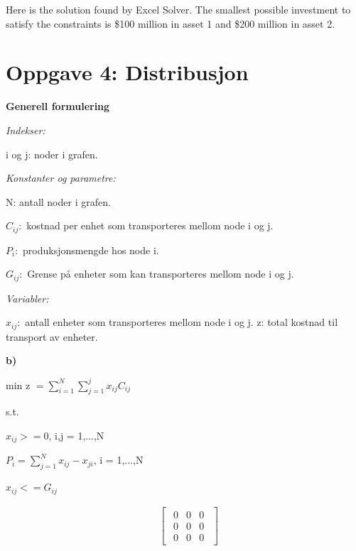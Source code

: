 \documentclass{article}
\begin{document}
    Here is the solution found by Excel Solver. The smallest possible investment to satisfy the constraints is \$100 million in asset 1 and \$200 million in asset 2.
    
    \pagebreak\section*{\textbf{Oppgave 4: Distribusjon}}
    \small\textbf{Generell formulering}

    \vspace*{5mm}
    \textit{Indekser:}
    
    i og j: noder i grafen.
    
    \vspace*{5mm}
    \textit{Konstanter og parametre:}
    
    N: antall noder i grafen.
    
    $C_{ij}:$ kostnad per enhet som transporteres mellom node i og j.
    
    $P_i:$ produksjonsmengde hos node i.
    
    $G_{ij}:$ Grense på enheter som kan transporteres mellom node i og j.
    
    \vspace*{5mm}
    \textit{Variabler:}
    
    $x_{ij}:$ antall enheter som transporteres mellom node i og j.
    z: total kostnad til transport av enheter.
    
    \vspace*{5mm}
    \textbf{b)}
    
    min z $= \sum_{i=1}^{N}\sum_{j=1}^{j}x_{ij}C_{ij}$

    \vspace*{5mm}
    s.t.

    $x_{ij} >= 0$, i,j = 1,...,N

    $P_i = \sum_{j=1}^{N}x_{ij} - x_{ji}$, i = 1,...,N

    $x_{ij} <= G_{ij}$

    \begin{align*}
        &\begin{bmatrix}
        \begin{array}{cc|c}
        0 & 0 & 0 \\
        0 & 0 & 0 \\
        0 & 0 & 0
        \end{array}
        \end{bmatrix}
        \end{align*}

    

    
\end{document}
